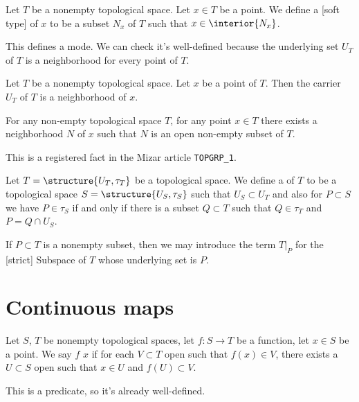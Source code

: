 \begin{definition}
Let $T$ be a nonempty topological space. Let $x\in T$ be a point.
We define a [soft type]  of $x$ to be a subset
$N_{x}$ of $T$ such that $x\in\interior{N_{x}}$.

This defines a mode. We can check it's well-defined because the
underlying set $U_{T}$ of $T$ is a neighborhood for every point of $T$.
\end{definition}

\begin{theorem}
Let $T$ be a nonempty topological space. Let $x$ be a point of $T$.
Then the carrier $U_{T}$ of $T$ is a neighborhood of $x$.
\end{theorem}

\begin{corollary}
For any non-empty topological space $T$, for any point $x\in T$ there
exists a neighborhood $N$ of $x$ such that $N$ is an open non-empty subset of $T$.
\end{corollary}

This is a registered fact in the Mizar article \texttt{TOPGRP\_1}.


\begin{definition}[Subspaces]
Let $T = \structure{U_{T},\tau_{T}}$ be a topological space.
We define a  of $T$ to be a topological space
$S=\structure{U_{S},\tau_{S}}$ such that $U_{S}\subset U_{T}$ and also
for $P\subset S$ we have $P\in\tau_{S}$ if and only if there is a
subset $Q\subset T$ such that $Q\in\tau_{T}$ and $P = Q\cap U_{S}$.

If $P\subset T$ is a nonempty subset, then we may introduce the term
$T|_{P}$ for the [strict] Subspace of $T$ whose underlying set is $P$.
\end{definition}


\section{Continuous maps}

\begin{definition}
Let $S$, $T$ be nonempty topological spaces, let $f\colon S\to T$ be a function,
let $x\in S$ be a point. We say $f$  $x$ if
for each $V\subset T$ open such that $f(x)\in V$, there exists a
$U\subset S$ open such that $x\in U$ and $f(U)\subset V$.

This is a predicate, so it's already well-defined.
\end{definition}

